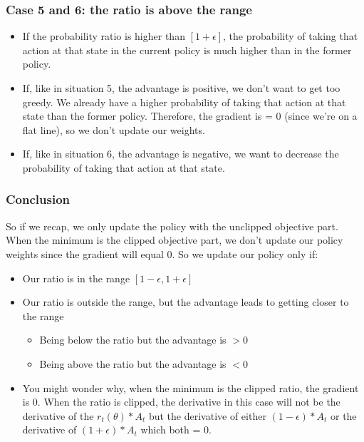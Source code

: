 \begin{frame}[fragile]\frametitle{Case 5 and 6: the ratio is above the range}

\begin{itemize}
\item If the probability ratio is higher than $[1 + \epsilon]$, the probability of taking that action at that state in the current policy is much higher than in the former policy.
\item 
If, like in situation 5, the advantage is positive, we don't want to get too greedy. We already have a higher probability of taking that action at that state than the former policy. Therefore, the gradient is = 0 (since we're on a flat line), so we don't update our weights.
\item 
If, like in situation 6, the advantage is negative, we want to decrease the probability of taking that action at that state.
\end{itemize}
\end{frame}

\begin{frame}[fragile]\frametitle{Conclusion}
So if we recap, we only update the policy with the unclipped objective part. When the minimum is the clipped objective part, we don't update our policy weights since the gradient will equal 0. So we update our policy only if:

\begin{itemize}
\item Our ratio is in the range $[1 - \epsilon, 1 + \epsilon]$
\item Our ratio is outside the range, but the advantage leads to getting closer to the range
\begin{itemize}
\item Being below the ratio but the advantage is $> 0$
\item Being above the ratio but the advantage is $< 0$
\end{itemize}

\item You might wonder why, when the minimum is the clipped ratio, the gradient is 0. When the ratio is clipped, the derivative in this case will not be the derivative of the $r_t(\theta) * A_t$ but the derivative of either $(1 - \epsilon)* A_t$  or the derivative of $(1 + \epsilon)* A_t$  which both = 0.
\end{itemize}
\end{frame}

